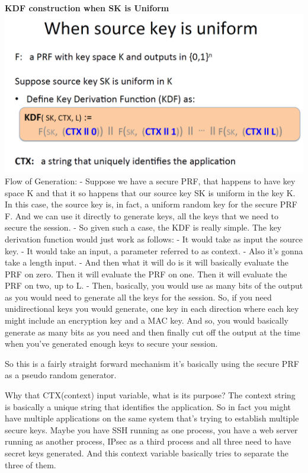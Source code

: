 \documentclass[11pt]{article}
\makeatletter
\def\maxwidth{\ifdim\Gin@nat@width>\linewidth\linewidth
    \else\Gin@nat@width\fi}
\let\Oldincludegraphics\includegraphics
\renewcommand{\includegraphics}[1]{\Oldincludegraphics[width=.8\maxwidth]{#1}}
\makeatother
\begin{document}
\textbf{KDF construction when SK is Uniform}
\includegraphics{./Images/KDF-UniformSK.png} Flow of Generation: -
Suppose we have a secure PRF, that happens to have key space K and that
it so happens that our source key SK is uniform in the key K. In this
case, the source key is, in fact, a uniform random key for the secure
PRF F. And we can use it directly to generate keys, all the keys that we
need to secure the session. - So given such a case, the KDF is really
simple. The key derivation function would just work as follows: - It
would take as input the source key. - It would take an input, a
parameter referred to as context. - Also it's gonna take a length input.
- And then what it will do is it will basically evaluate the PRF on
zero. Then it will evaluate the PRF on one. Then it will evaluate the
PRF on two, up to L. - Then, basically, you would use as many bits of
the output as you would need to generate all the keys for the session.
So, if you need unidirectional keys you would generate, one key in each
direction where each key might include an encryption key and a MAC key.
And so, you would basically generate as many bits as you need and then
finally cut off the output at the time when you've generated enough keys
to secure your session.

So this is a fairly straight forward mechanism it's basically using the
secure PRF as a pseudo random generator.

Why that CTX(context) input variable, what is its purpose? The context
string is basically a unique string that identifies the application. So
in fact you might have multiple applications on the same system that's
trying to establish multiple secure keys. Maybe you have SSH running as
one process, you have a web server running as another process, IPsec as
a third process and all three need to have secret keys generated. And
this context variable basically tries to separate the three of them.
\end{document}
